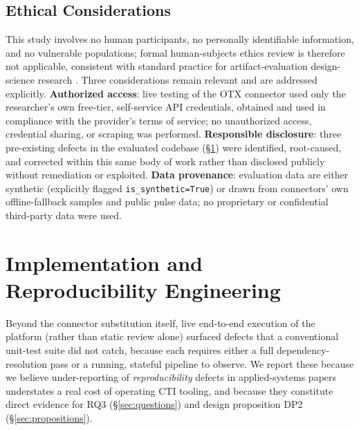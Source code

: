 \documentclass[conference]{IEEEtran}
\begin{document}
\subsection{Ethical Considerations}
\label{sec:ethics}
This study involves no human participants, no personally identifiable information, and no vulnerable populations; formal human-subjects ethics review is therefore not applicable, consistent with standard practice for artifact-evaluation design-science research \cite{hevner2004design}. Three considerations remain relevant and are addressed explicitly. \textbf{Authorized access}: live testing of the OTX connector used only the researcher's own free-tier, self-service API credentials, obtained and used in compliance with the provider's terms of service; no unauthorized access, credential sharing, or scraping was performed. \textbf{Responsible disclosure}: three pre-existing defects in the evaluated codebase (\S\ref{sec:implementation}) were identified, root-caused, and corrected within this same body of work rather than disclosed publicly without remediation or exploited. \textbf{Data provenance}: evaluation data are either synthetic (explicitly flagged \texttt{is\_synthetic=True}) or drawn from connectors' own offline-fallback samples and public pulse data; no proprietary or confidential third-party data were used.

\section{Implementation and Reproducibility Engineering}
\label{sec:implementation}

Beyond the connector substitution itself, live end-to-end execution of the platform (rather than static review alone) surfaced defects that a conventional unit-test suite did not catch, because each requires either a full dependency-resolution pass or a running, stateful pipeline to observe. We report these because we believe under-reporting of \emph{reproducibility} defects in applied-systems papers understates a real cost of operating CTI tooling, and because they constitute direct evidence for RQ3 (\S\ref{sec:questions}) and design proposition DP2 (\S\ref{sec:propositions}).
\end{document}

